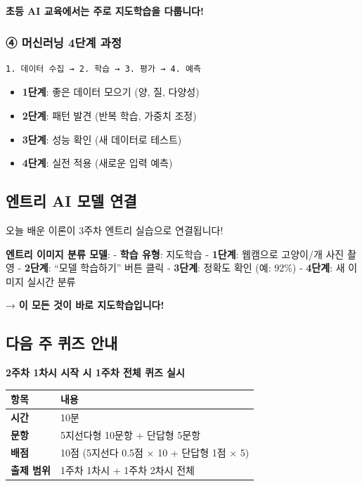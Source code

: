 \documentclass[a4paper, 11pt]{article}
\providecommand{\tightlist}{%
  \setlength{\itemsep}{0pt}\setlength{\parskip}{0pt}}
\begin{document}
\textbf{ 초등 AI 교육에서는 주로 지도학습을 다룹니다!}

\hypertarget{uxba38uxc2e0uxb7ecuxb2dd-4uxb2e8uxacc4-uxacfcuxc815}{%
\subsubsection{\textbf{④} 머신러닝 4단계
과정}\label{uxba38uxc2e0uxb7ecuxb2dd-4uxb2e8uxacc4-uxacfcuxc815}}

\begin{verbatim}
1. 데이터 수집 → 2. 학습 → 3. 평가 → 4. 예측
\end{verbatim}

\begin{itemize}
\tightlist
\item
  \textbf{1단계}: 좋은 데이터 모으기 (양, 질, 다양성)
\item
  \textbf{2단계}: 패턴 발견 (반복 학습, 가중치 조정)
\item
  \textbf{3단계}: 성능 확인 (새 데이터로 테스트)
\item
  \textbf{4단계}: 실전 적용 (새로운 입력 예측)
\end{itemize}

\hypertarget{uxc5d4uxd2b8uxb9ac-ai-uxbaa8uxb378-uxc5f0uxacb0-1}{%
\subsection{엔트리 AI 모델
연결}\label{uxc5d4uxd2b8uxb9ac-ai-uxbaa8uxb378-uxc5f0uxacb0-1}}

오늘 배운 이론이 3주차 엔트리 실습으로 연결됩니다!

\textbf{엔트리 이미지 분류 모델}: - \textbf{학습 유형}: 지도학습 -
\textbf{1단계}: 웹캠으로 고양이/개 사진 촬영 - \textbf{2단계}: ``모델
학습하기'' 버튼 클릭 - \textbf{3단계}: 정확도 확인 (예: 92\%) -
\textbf{4단계}: 새 이미지 실시간 분류

→ \textbf{이 모든 것이 바로 지도학습입니다!}

\hypertarget{uxb2e4uxc74c-uxc8fc-uxd034uxc988-uxc548uxb0b4}{%
\subsection{다음 주 퀴즈
안내}\label{uxb2e4uxc74c-uxc8fc-uxd034uxc988-uxc548uxb0b4}}

\textbf{2주차 1차시 시작 시 1주차 전체 퀴즈 실시}

\begin{longtable}{p{4cm}p{10cm}}
\toprule\noalign{}
항목 & 내용 \\
\midrule\noalign{}
\endhead
\bottomrule\noalign{}
\endlastfoot
\textbf{시간} & 10분 \\
\textbf{문항} & 5지선다형 10문항 + 단답형 5문항 \\
\textbf{배점} & 10점 (5지선다 0.5점 × 10 + 단답형 1점 × 5) \\
\textbf{출제 범위} & 1주차 1차시 + 1주차 2차시 전체 \\
\end{longtable}
\end{document}
